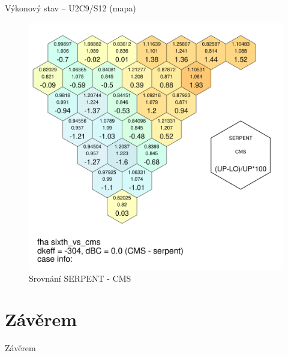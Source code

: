 \documentclass{beamer}
\begin{document}
\begin{frame}{Výkonový stav -- U2C9/S12 (mapa)}
	\begin{figure}[!h]
		\centering
		\includegraphics[scale=0.13]{img/fha_sixth_vs_cms.pdf}
		\caption{Srovnání SERPENT - CMS}
	\end{figure}
\end{frame}


\section{Závěrem}

\begin{frame}{Závěrem}


\end{frame}
\end{document}
